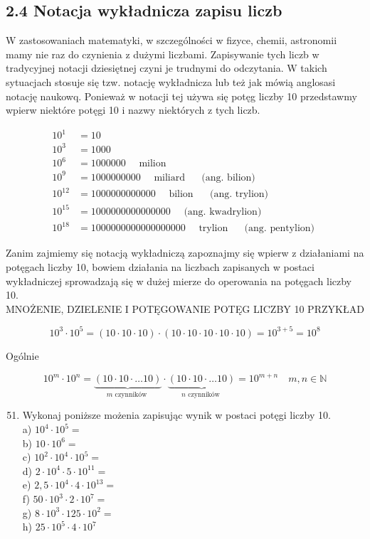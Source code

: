 \documentclass[10pt]{article}
\begin{document}
\subsection*{2.4 Notacja wykładnicza zapisu liczb}
W zastosowaniach matematyki, w szczególności w fizyce, chemii, astronomii mamy nie raz do czynienia z dużymi liczbami. Zapisywanie tych liczb w tradycyjnej notacji dziesiętnej czyni je trudnymi do odczytania. W takich sytuacjach stosuje się tzw. notację wykładnicza lub też jak mówią anglosasi notację naukowq. Ponieważ w notacji tej używa się potęg liczby 10 przedstawmy wpierw niektóre potęgi 10 i nazwy niektórych z tych liczb.

\[
\begin{aligned}
10^{1} & =10 \\
10^{3} & =1000 \\
10^{6} & =1000000 \quad \text { milion } \\
10^{9} & =1000000000 \quad \text { miliard } \quad \text { (ang. bilion) } \\
10^{12} & =1000000000000 \quad \text { bilion } \quad \text { (ang. trylion) } \\
10^{15} & =1000000000000000 \quad \text { (ang. kwadrylion) } \\
10^{18} & =1000000000000000000 \quad \text { trylion } \quad \text { (ang. pentylion) }
\end{aligned}
\]

Zanim zajmiemy się notacją wykładniczą zapoznajmy się wpierw z działaniami na potęgach liczby 10, bowiem działania na liczbach zapisanych w postaci wykładniczej sprowadzają się w dużej mierze do operowania na potęgach liczby 10.\\
MNOŻENIE, DZIELENIE I POTĘGOWANIE POTĘG LICZBY 10 PRZYKŁAD

\[
10^{3} \cdot 10^{5}=(10 \cdot 10 \cdot 10) \cdot(10 \cdot 10 \cdot 10 \cdot 10 \cdot 10)=10^{3+5}=10^{8}
\]

Ogólnie

\[
10^{m} \cdot 10^{n}=\underbrace{(10 \cdot 10 \cdot \ldots 10)}_{m \text { czynników }} \cdot \underbrace{(10 \cdot 10 \cdot \ldots 10)}_{n \text { czynników }}=10^{m+n} \quad m, n \in \mathbb{N}
\]

\begin{enumerate}
  \setcounter{enumi}{50}
  \item Wykonaj poniższe możenia zapisując wynik w postaci potęgi liczby 10.\\
a) \(10^{4} \cdot 10^{5}=\)\\
b) \(10 \cdot 10^{6}=\)\\
c) \(10^{2} \cdot 10^{4} \cdot 10^{5}=\)\\
d) \(2 \cdot 10^{4} \cdot 5 \cdot 10^{11}=\)\\
e) \(2,5 \cdot 10^{4} \cdot 4 \cdot 10^{13}=\)\\
f) \(50 \cdot 10^{3} \cdot 2 \cdot 10^{7}=\)\\
g) \(8 \cdot 10^{3} \cdot 125 \cdot 10^{2}=\)\\
h) \(25 \cdot 10^{5} \cdot 4 \cdot 10^{7}\)
\end{enumerate}
\end{document}
